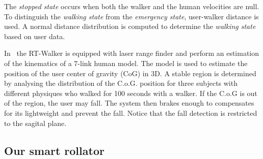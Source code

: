 \documentclass[letterpaper, 10 pt, conference]{ieeeconf}
\begin{document}
The\textit{ stopped state} occurs when both the walker and the human velocities are null. To distinguish the \textit{walking state} from the \textit{emergency state}, user-walker distance is used.  A normal distance distribution is computed to determine the  \textit{walking state} based on user data.%

In~\cite{Hirata2008a} the RT-Walker is equipped with laser range finder and perform an estimation of the kinematics of a 7-link human model. The model is used to estimate the position of the user center of gravity (CoG) in 3D. A stable region is determined by analysing the distribution of the C.o.G. position for three subjects with different physiques who walked for 100 seconds with a walker. If the C.o.G is out of the region, the user may fall. The system then brakes enough to compensates for its lightweight and prevent the fall. Notice that the fall detection is restricted to the sagital plane. %


\subsection{Our smart rollator}
\end{document}
